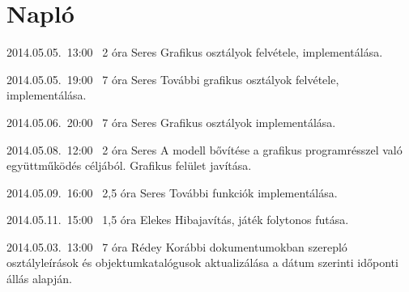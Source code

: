 %
\section{Napló}

\begin{naplo}

\bejegyzes
{2014.05.05.~13:00~}
{2 óra}
{Seres}
{Grafikus osztályok felvétele, implementálása.}

\bejegyzes
{2014.05.05.~19:00~}
{7 óra}
{Seres}
{További grafikus osztályok felvétele, implementálása.}

\bejegyzes
{2014.05.06.~20:00~}
{7 óra}
{Seres}
{Grafikus osztályok implementálása.}

\bejegyzes
{2014.05.08.~12:00~}
{2 óra}
{Seres}
{A modell bővítése a grafikus programrésszel való együttműködés céljából. Grafikus felület javítása.}

\bejegyzes
{2014.05.09.~16:00~}
{2,5 óra}
{Seres}
{További funkciók implementálása.}

\bejegyzes
{2014.05.11.~15:00~}
{1,5 óra}
{Elekes}
{Hibajavítás, játék folytonos futása.}

\bejegyzes
{2014.05.03.~13:00~}
{7 óra}
{Rédey}
{Korábbi dokumentumokban szerepló osztályleírások és objektumkatalógusok aktualizálása a dátum szerinti időponti állás alapján.}


\end{naplo}

